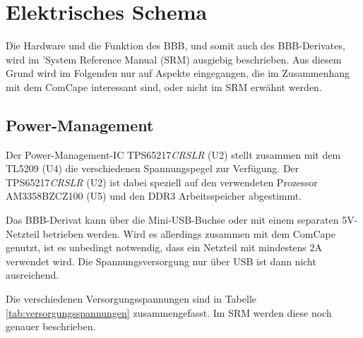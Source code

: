 \section{Elektrisches Schema}
Die Hardware und die Funktion des BBB, und somit auch des BBB-Derivates, wird im 'System Reference Manual (SRM) \cite{adafruitSRM} ausgiebig beschrieben. Aus diesem Grund wird im Folgenden nur auf Aspekte eingegangen, die im Zusammenhang mit dem ComCape interessant sind, oder nicht im SRM erwähnt werden.


\subsection{Power-Management}
Der Power-Management-IC TPS65217\textit{CRSLR} (U2) stellt zusammen mit dem TL5209 (U4) die verschiedenen Spannungspegel zur Verfügung. Der TPS65217\textit{CRSLR} (U2) ist dabei speziell auf den verwendeten Prozessor AM3358BZCZ100 (U5) und den DDR3 Arbeitsspeicher abgestimmt.

Das BBB-Derivat kann über die Mini-USB-Buchse oder mit einem separaten 5V-Netzteil betrieben werden. Wird es allerdings zusammen mit dem ComCape genutzt, ist es unbedingt notwendig, dass ein Netzteil mit mindestens 2A verwendet wird. Die Spannungsversorgung nur über USB ist dann nicht ausreichend.


Die verschiedenen Versorgungsspannungen sind in Tabelle \ref{tab:versorgungsspannungen} zusammengefasst. Im SRM\cite{adafruitSRM} werden diese noch genauer beschrieben.

